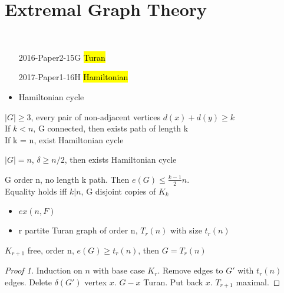 \section{Extremal Graph Theory}\label{sec:extremal-graph-theory}

\begin{exam}
    \,
    \begin{enumerate}
        \item[2016-Paper2-15G] \hl{Turan}
        \item[2017-Paper1-16H] \hl{Hamiltonian}
    \end{enumerate}
\end{exam}

\begin{itemize}
    \item Hamiltonian cycle
\end{itemize}

\begin{thm}
    $|G| \geq 3$, every pair of non-adjacent vertices $d(x) + d(y) \geq k$ \\
    If $k < n$, G connected, then exists path of length k \\
    If k = n, exist Hamiltonian cycle
\end{thm}

\begin{cor}[Dirac]
    $|G| = n$, $\delta \geq n/2$, then exists Hamiltonian cycle
\end{cor}

\begin{thm}
    G order n, no length k path.
    Then $e(G) \leq \frac{k-1}{2} n$. \\
    Equality holds iff $k|n$, G disjoint copies of $K_k$
\end{thm}

\begin{itemize}
    \item $ex(n, F)$
    \item r partite Turan graph of order n, $T_r(n)$ with size $t_r(n)$
\end{itemize}

\begin{thm}[Turan]
    $K_{r+1}$ free, order n, $e(G) \geq t_r(n)$, then $G = T_r(n)$
\end{thm}

\begin{proof}[Proof 1]
    Induction on $n$ with base case $K_r$.
    Remove edges to $G'$ with $t_r(n)$ edges.
    Delete $\delta(G')$ vertex $x$.
    $G - {x}$ Turan.
    Put back $x$.
    $T_{r+1}$ maximal.
\end{proof}

